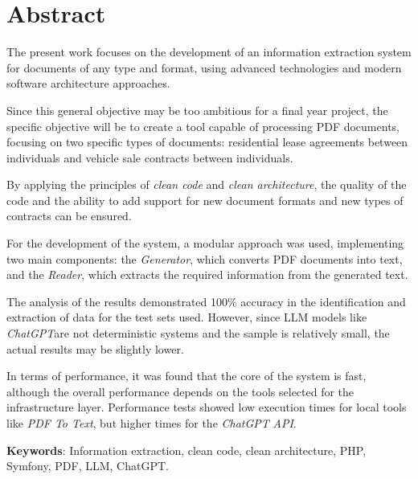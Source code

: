 \newpage
\section*{Abstract}
The present work focuses on the development of an information extraction system for documents of any type and format,
using advanced technologies and modern software architecture approaches.

Since this general objective may be too ambitious for a final year project, the specific objective will be to create a
tool capable of processing PDF documents, focusing on two specific types of documents: residential lease agreements
between individuals and vehicle sale contracts between individuals.

By applying the principles of \textit{clean code} and \textit{clean architecture}, the quality of the code and the
ability to add support for new document formats and new types of contracts can be ensured.

For the development of the system, a modular approach was used, implementing two main components: the
\textit{Generator}, which converts PDF documents into text, and the \textit{Reader}, which extracts the required
information from the generated text.

The analysis of the results demonstrated 100\% accuracy in the identification and extraction of data for the test
sets used.
However, since LLM models like \textit{ChatGPT}are not deterministic systems and the sample is relatively small, the
actual results may be slightly lower.

In terms of performance, it was found that the core of the system is fast, although the overall performance depends on
the tools selected for the infrastructure layer.
Performance tests showed low execution times for local tools like \textit{PDF To Text}, but higher times for the
\textit{ChatGPT} \textit{API}.



\vspace{1cm}

\textbf{Keywords}: Information extraction, clean code, clean architecture, PHP, Symfony, PDF, LLM, ChatGPT.

